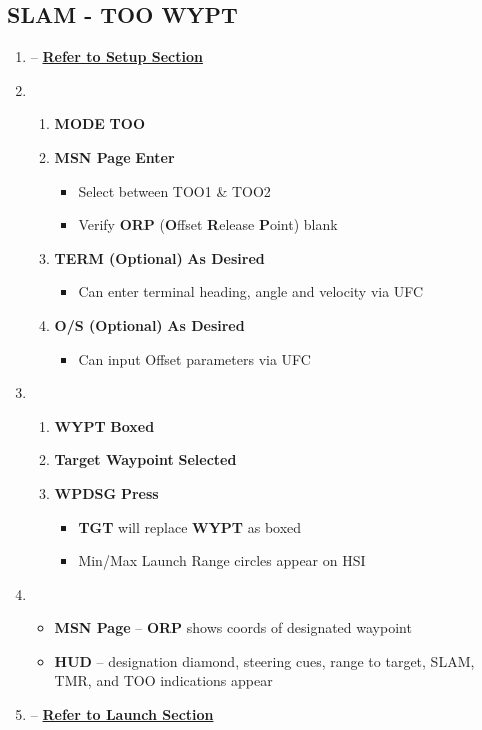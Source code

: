 \documentclass[fontInter]{TechCheck}
\begin{document}
	\clearpage

	\subsection{SLAM - TOO WYPT}
	\begin{enumerate}[leftmargin=0.1\textwidth, rightmargin=0.1\textwidth, itemsep=4pt, label=\textbf{\arabic*.}]
		\item {} -- \hyperref[subsec:slamsetup]{\textbf{Refer to Setup Section}} 
		\item {} 
		\begin{enumerate}[itemsep=4pt]
			\item \textbf{MODE} \dotfill \textbf{TOO}
			\item \textbf{MSN Page} \dotfill \textbf{Enter}
			\begin{itemize}
				\item Select between TOO1 \& TOO2
				\item Verify \textbf{ORP} (\textbf{O}ffset \textbf{R}elease \textbf{P}oint) blank
			\end{itemize}
			\item \textbf{TERM (Optional)} \dotfill \textbf{As Desired}
			\begin{itemize}
				\item Can enter terminal heading, angle and velocity via UFC
			\end{itemize}
			\item \textbf{O/S (Optional)} \dotfill \textbf{As Desired}
			\begin{itemize}
				\item Can input Offset parameters via UFC
			\end{itemize}
		\end{enumerate}
		\item {} 
		\begin{enumerate}[itemsep=4pt]
			\item \textbf{WYPT} \dotfill \textbf{Boxed}
			\item \textbf{Target Waypoint} \dotfill \textbf{Selected}
			\item \textbf{WPDSG} \dotfill \textbf{Press}
			\begin{itemize}
				\item \textbf{TGT} will replace \textbf{WYPT} as boxed 
				\item Min/Max Launch Range circles appear on HSI
			\end{itemize}
		\end{enumerate}
		\item {} 
		\begin{itemize}
			\item \textbf{MSN Page} -- \textbf{ORP} shows coords of designated waypoint
			\item \textbf{HUD} -- designation diamond, steering cues, range to target, SLAM, TMR, and TOO indications appear
		\end{itemize}
		\item {} -- \hyperref[subsec:slamlaunch]{\textbf{Refer to Launch Section}}
	\end{enumerate}
\end{document}
